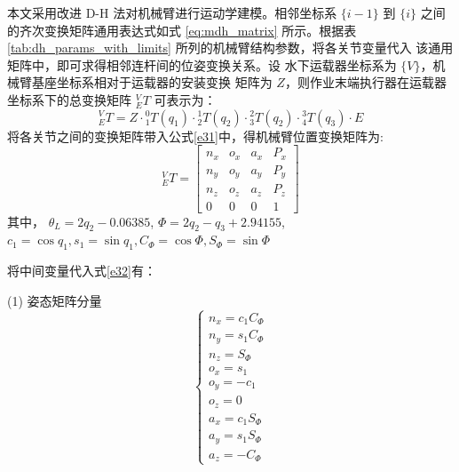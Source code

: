 本文采用改进 D-H 法对机械臂进行运动学建模。相邻坐标系 $\{i-1\}$ 到 $\{i\}$ 
之间的齐次变换矩阵通用表达式如式 \ref{eq:mdh_matrix} 所示。根据表 
\ref{tab:dh_params_with_limits} 所列的机械臂结构参数，将各关节变量代入
该通用矩阵中，即可求得相邻连杆间的位姿变换关系。设
水下运载器坐标系为 $\{V\}$，机械臂基座坐标系相对于运载器的安装变换
矩阵为 $Z$，则作业末端执行器在运载器坐标系下的总变换矩阵 ${}^{V}_{E}T$ 
可表示为：
\begin{equation}
    {}^{V}_{E}T = Z \cdot {}^{0}_{1}T({q_1}) \cdot {}^{1}_{2}T({q_2}) \cdot {}^{2}_{3}T({q_2}) \cdot {}^{3}_{4}T({q_3})\cdot E
    \label{e31}
\end{equation}
将各关节之间的变换矩阵带入公式\ref{e31}中，得机械臂位置变换矩阵为:
\begin{equation}
    {}^{V}_{E}T = \begin{bmatrix}
    n_x & o_x & a_x & P_x \\
    n_y & o_y & a_y & P_y \\
    n_z & o_z & a_z & P_z \\
    0 & 0 & 0 & 1
    \end{bmatrix}
    \label{e32}
    \end{equation}
    其中， $\theta_{L} = 2q_2 - 0.06385$,
$\Phi = 2q_2 - q_3 + 2.94155$,
$c_1 = \cos q_1, s_1 = \sin q_1, C_{\Phi} = \cos \Phi, S_{\Phi} = \sin \Phi$

    将中间变量代入式\ref{e32}有：

    (1) 姿态矩阵分量
    \begin{equation}
      \left\{\begin{array}{c}
      n_x = c_1 C_{\Phi} \\
      n_y = s_1 C_{\Phi} \\
      n_z = S_{\Phi}\\
      o_x = s_1 \\
      o_y = -c_1 \\
      o_z = 0\\
      a_x = c_1 S_{\Phi} \\
      a_y = s_1 S_{\Phi} \\
      a_z = -C_{\Phi}
      \end{array}\right.
    \end{equation}

